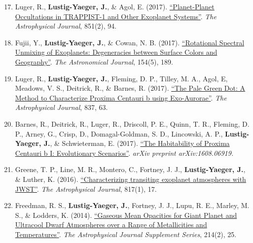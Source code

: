 \documentclass[margin,10pt]{res}
\newenvironment{benumerate}[1]{
    \let\oldItem\item
    \def\item{\addtocounter{enumi}{-2}\oldItem}
    \begin{enumerate}
    \setcounter{enumi}{#1}
    \addtocounter{enumi}{1}
}{
    \end{enumerate}
}
\begin{document}
\begin{resume}
\begin{benumerate}{16}
                    \item Luger, R., \textbf{Lustig-Yaeger, J.}, \& Agol, E. (2017).  \href{http://adsabs.harvard.edu/abs/2017ApJ...851...94L}{``Planet-Planet Occultations in TRAPPIST-1 and Other Exoplanet Systems''}. \textit{The Astrophysical Journal}, 851(2), 94.
                    \item Fujii, Y., \textbf{Lustig-Yaeger, J.}, \& Cowan, N. B. (2017). \href{http://adsabs.harvard.edu/abs/2017arXiv170804886F}{``Rotational Spectral Unmixing of Exoplanets: Degeneracies between Surface Colors and Geography''}. \textit{The Astronomical Journal}, 154(5), 189.
                    \item Luger, R., \textbf{Lustig-Yaeger, J.}, Fleming, D. P., Tilley, M. A., Agol, E, Meadows, V. S., Deitrick, R., \& Barnes, R. (2017). \href{http://adsabs.harvard.edu/abs/2017ApJ...837...63L}{``The Pale Green Dot: A Method to Characterize Proxima Centauri b using Exo-Aurorae''}. \textit{The Astrophysical Journal}, 837, 63.
                    \item Barnes, R., Deitrick, R., Luger, R., Driscoll, P. E., Quinn, T. R., Fleming, D. P., Arney, G., Crisp, D., Domagal-Goldman, S. D., Lincowski, A. P., \textbf{Lustig-Yaeger, J.}, \& Schwieterman, E. (2017). \href{http://adsabs.harvard.edu/cgi-bin/bib_query?arXiv:1608.06919}{``The Habitability of Proxima Centauri b I: Evolutionary Scenarios''}. \textit{arXiv preprint arXiv:1608.06919.}
                    \item Greene, T. P., Line, M. R., Montero, C., Fortney, J. J., \textbf{Lustig-Yaeger, J.}, \& Luther, K. (2016). \href{http://adsabs.harvard.edu/abs/2016ApJ...817...17G}{``Characterizing transiting exoplanet atmospheres with JWST''}. \textit{The Astrophysical Journal}, 817(1), 17.
                    \item Freedman, R. S., \textbf{Lustig-Yaeger, J.}, Fortney, J. J., Lupu, R. E., Marley, M. S., \& Lodders, K. (2014). \href{http://adsabs.harvard.edu/abs/2014ApJS..214...25F}{``Gaseous Mean Opacities for Giant Planet and Ultracool Dwarf Atmospheres over a Range of Metallicities and Temperatures''}. \textit{The Astrophysical Journal Supplement Series}, 214(2), 25.\\
                \end{benumerate}
                 

\end{resume}
\end{document}
